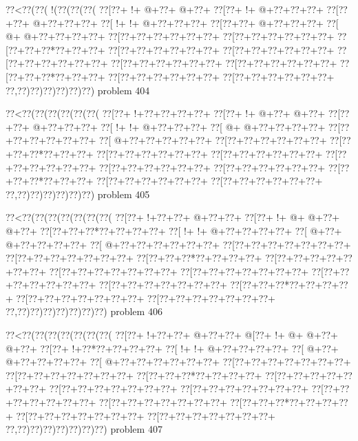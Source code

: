 \vbox{\vbox{\goo
\0??<\0??(\0??(\- !(\0??(\0??(\0??(
\0??[\0??+\- !+\- @+\0??+\- @+\0??+
\0??[\0??+\- !+\- @+\0??+\0??+\0??+
\0??[\0??+\0??+\- @+\0??+\0??+\0??+
\0??[\- !+\- !+\- @+\0??+\0??+\0??+
\0??[\0??+\0??+\- @+\0??+\0??+\0??+
\0??[\- @+\- @+\0??+\0??+\0??+\0??+
\0??[\0??+\0??+\0??+\0??+\0??+\0??+
\0??[\0??+\0??+\0??+\0??+\0??+\0??+
\0??[\0??+\0??+\0??*\0??+\0??+\0??+
\0??[\0??+\0??+\0??+\0??+\0??+\0??+
\0??[\0??+\0??+\0??+\0??+\0??+\0??+
\0??[\0??+\0??+\0??+\0??+\0??+\0??+
\0??[\0??+\0??+\0??+\0??+\0??+\0??+
\0??[\0??+\0??+\0??+\0??+\0??+\0??+
\0??[\0??+\0??+\0??*\0??+\0??+\0??+
\0??[\0??+\0??+\0??+\0??+\0??+\0??+
\0??[\0??+\0??+\0??+\0??+\0??+\0??+
\0??,\0??)\0??)\0??)\0??)\0??)\0??)
}
\hfil problem 404\hfil\break
}

\vbox{\vbox{\goo
\0??<\0??(\0??(\0??(\0??(\0??(\0??(
\0??[\0??+\- !+\0??+\0??+\0??+\0??+
\0??[\0??+\- !+\- @+\0??+\- @+\0??+
\0??[\0??+\0??+\- @+\0??+\0??+\0??+
\0??[\- !+\- !+\- @+\0??+\0??+\0??+
\0??[\- @+\- @+\0??+\0??+\0??+\0??+
\0??[\0??+\0??+\0??+\0??+\0??+\0??+
\0??[\- @+\0??+\0??+\0??+\0??+\0??+
\0??[\0??+\0??+\0??+\0??+\0??+\0??+
\0??[\0??+\0??+\0??*\0??+\0??+\0??+
\0??[\0??+\0??+\0??+\0??+\0??+\0??+
\0??[\0??+\0??+\0??+\0??+\0??+\0??+
\0??[\0??+\0??+\0??+\0??+\0??+\0??+
\0??[\0??+\0??+\0??+\0??+\0??+\0??+
\0??[\0??+\0??+\0??+\0??+\0??+\0??+
\0??[\0??+\0??+\0??*\0??+\0??+\0??+
\0??[\0??+\0??+\0??+\0??+\0??+\0??+
\0??[\0??+\0??+\0??+\0??+\0??+\0??+
\0??,\0??)\0??)\0??)\0??)\0??)\0??)
}
\hfil problem 405\hfil\break
}

\vbox{\vbox{\goo
\0??<\0??(\0??(\0??(\0??(\0??(\0??(\0??(
\0??[\0??+\- !+\0??+\0??+\- @+\0??+\0??+
\0??[\0??+\- !+\- @+\- @+\0??+\- @+\0??+
\0??[\0??+\0??+\0??*\0??+\0??+\0??+\0??+
\0??[\- !+\- !+\- @+\0??+\0??+\0??+\0??+
\0??[\- @+\0??+\- @+\0??+\0??+\0??+\0??+
\0??[\- @+\0??+\0??+\0??+\0??+\0??+\0??+
\0??[\0??+\0??+\0??+\0??+\0??+\0??+\0??+
\0??[\0??+\0??+\0??+\0??+\0??+\0??+\0??+
\0??[\0??+\0??+\0??*\0??+\0??+\0??+\0??+
\0??[\0??+\0??+\0??+\0??+\0??+\0??+\0??+
\0??[\0??+\0??+\0??+\0??+\0??+\0??+\0??+
\0??[\0??+\0??+\0??+\0??+\0??+\0??+\0??+
\0??[\0??+\0??+\0??+\0??+\0??+\0??+\0??+
\0??[\0??+\0??+\0??+\0??+\0??+\0??+\0??+
\0??[\0??+\0??+\0??*\0??+\0??+\0??+\0??+
\0??[\0??+\0??+\0??+\0??+\0??+\0??+\0??+
\0??[\0??+\0??+\0??+\0??+\0??+\0??+\0??+
\0??,\0??)\0??)\0??)\0??)\0??)\0??)\0??)
}
\hfil problem 406\hfil\break
}

\vbox{\vbox{\goo
\0??<\0??(\0??(\0??(\0??(\0??(\0??(\0??(
\0??[\0??+\- !+\0??+\0??+\- @+\0??+\0??+
\- @[\0??+\- !+\- @+\- @+\0??+\- @+\0??+
\0??[\0??+\- !+\0??*\0??+\0??+\0??+\0??+
\0??[\- !+\- !+\- @+\0??+\0??+\0??+\0??+
\0??[\- @+\0??+\- @+\0??+\0??+\0??+\0??+
\0??[\- @+\0??+\0??+\0??+\0??+\0??+\0??+
\0??[\0??+\0??+\0??+\0??+\0??+\0??+\0??+
\0??[\0??+\0??+\0??+\0??+\0??+\0??+\0??+
\0??[\0??+\0??+\0??*\0??+\0??+\0??+\0??+
\0??[\0??+\0??+\0??+\0??+\0??+\0??+\0??+
\0??[\0??+\0??+\0??+\0??+\0??+\0??+\0??+
\0??[\0??+\0??+\0??+\0??+\0??+\0??+\0??+
\0??[\0??+\0??+\0??+\0??+\0??+\0??+\0??+
\0??[\0??+\0??+\0??+\0??+\0??+\0??+\0??+
\0??[\0??+\0??+\0??*\0??+\0??+\0??+\0??+
\0??[\0??+\0??+\0??+\0??+\0??+\0??+\0??+
\0??[\0??+\0??+\0??+\0??+\0??+\0??+\0??+
\0??,\0??)\0??)\0??)\0??)\0??)\0??)\0??)
}
\hfil problem 407\hfil\break
}

